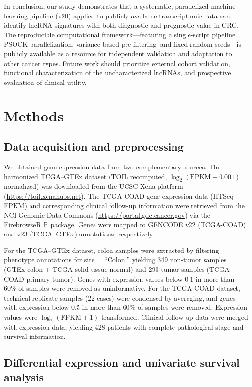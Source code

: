 \documentclass[fleqn,10pt]{wlscirep}
\begin{document}
In conclusion, our study demonstrates that a systematic, parallelized machine learning pipeline (v20) applied to publicly available transcriptomic data can identify lncRNA signatures with both diagnostic and prognostic value in CRC. The reproducible computational framework—featuring a single-script pipeline, PSOCK parallelization, variance-based pre-filtering, and fixed random seeds—is publicly available as a resource for independent validation and adaptation to other cancer types. Future work should prioritize external cohort validation, functional characterization of the uncharacterized lncRNAs, and prospective evaluation of clinical utility.

\section*{Methods}

\subsection*{Data acquisition and preprocessing}

We obtained gene expression data from two complementary sources. The harmonized TCGA--GTEx dataset (TOIL recomputed, $\log_2(\text{FPKM}+0.001)$ normalized) was downloaded from the UCSC Xena platform (\url{https://toil.xenahubs.net}). The TCGA-COAD gene expression data (HTSeq-FPKM) and corresponding clinical follow-up information were retrieved from the NCI Genomic Data Commons (\url{https://portal.gdc.cancer.gov}) via the FirebrowseR R package\cite{RN25}. Genes were mapped to GENCODE v22 (TCGA-COAD) and v23 (TCGA--GTEx) annotations, respectively.

For the TCGA--GTEx dataset, colon samples were extracted by filtering phenotype annotations for site = ``Colon,'' yielding 349 non-tumor samples (GTEx colon + TCGA solid tissue normal) and 290 tumor samples (TCGA-COAD primary tumor). Genes with expression values below 0.1 in more than 60\% of samples were removed as uninformative. For the TCGA-COAD dataset, technical replicate samples (22 cases) were condensed by averaging, and genes with expression below 0.5 in more than 60\% of samples were removed. Expression values were $\log_2(\text{FPKM}+1)$ transformed. Clinical follow-up data were merged with expression data, yielding 428 patients with complete pathological stage and survival information.

\subsection*{Differential expression and univariate survival analysis}
\end{document}
